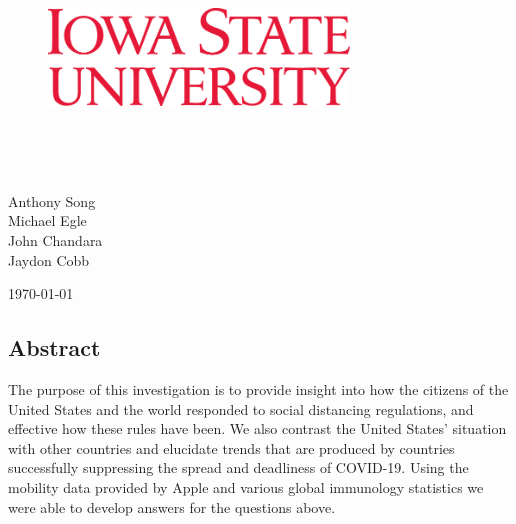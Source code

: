 \documentclass[11pt, english]{article}
\begin{document}
\begin{center}
\vspace*{-1in}
\begin{figure}[htb]
\begin{center}
\includegraphics[width=8cm]{logo.png}
\end{center}
\end{figure}
\begin{large}
\\
\end{large}
\vspace*{0.2in}
\begin{Huge}
\\
\end{Huge}
\vspace*{0.3in}
\begin{Large}
Anthony Song\\
Michael Egle\\
John Chandara\\
Jaydon Cobb\\
\end{Large}
\vspace*{0.3in}
\today\\
\end{center}
\newpage
\begin{center}
\begin{large}
\section*{Abstract}
The purpose of this investigation is to provide insight into how the citizens of the United States and the world responded to social distancing regulations, and effective how these rules have been. We also contrast the United States’ situation with other countries and elucidate trends that are produced by countries successfully suppressing the spread and deadliness of COVID-19. Using the mobility data provided by Apple and various global immunology statistics we were able to develop answers for the questions above.
\end{large}
\end{center}
\newpage
\end{document}
